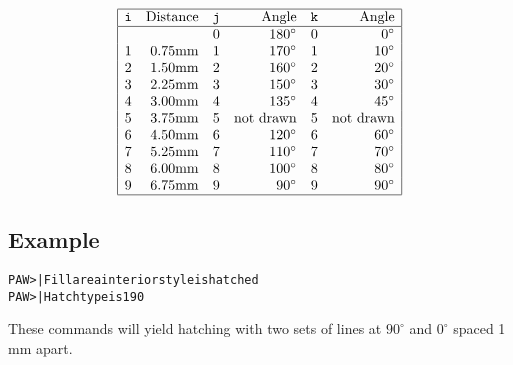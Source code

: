 \begin{table}
\[
\begin{array}{|crcrcr|}
\hline
\mbox{\tt i} &  \mathrm{Distance} &
\mbox{\tt j} &  \mathrm{Angle}    &
\mbox{\tt k} &  \mathrm{Angle}     \\
\hline
   &                               &
0  & 180^{\circ}                   &
0  &   0^{\circ}                   \\
1  & 0.75 \mathrm{mm}              &
1  & 170^{\circ}                   &
1  &  10^{\circ}                   \\
2  & 1.50 \mathrm{mm}              &
2  & 160^{\circ}                   &
2  &  20^{\circ}                   \\
3  & 2.25 \mathrm{mm}              &
3  & 150^{\circ}                   &
3  &  30^{\circ}                   \\
4  & 3.00 \mathrm{mm}              &
4  & 135^{\circ}                   &
4  &  45^{\circ}                   \\
5  & 3.75 \mathrm{mm}              &
5  & \multicolumn{1}{c}{\mbox{not drawn}} &
5  & \multicolumn{1}{c|}{\mbox{not drawn}} \\
6  & 4.50 \mathrm{mm}              &
6  & 120^{\circ}                   &
6  &  60^{\circ}                   \\
7  & 5.25 \mathrm{mm}              &
7  & 110^{\circ}                   &
7  &  70^{\circ}                   \\
8  & 6.00 \mathrm{mm}              &
8  & 100^{\circ}                   &
8  &  80^{\circ}                   \\
9  & 6.75 \mathrm{mm}              &
9  &  90^{\circ}                   &
9  &  90^{\circ}                   \\
\hline
\end{array}
\]
\caption{Codification for the HIGZ portable fill area interior styles}
\label{tab:HIGZSTY}
\end{table}

\subsection*{Example}
\begin{alltt}
PAW >       | Fill area interior style is hatched
PAW >     | Hatch type is 190
\end{alltt}
These commands will yield hatching with two sets of lines
at $90^{\circ}$ and $0^{\circ}$ spaced 1 mm apart.

